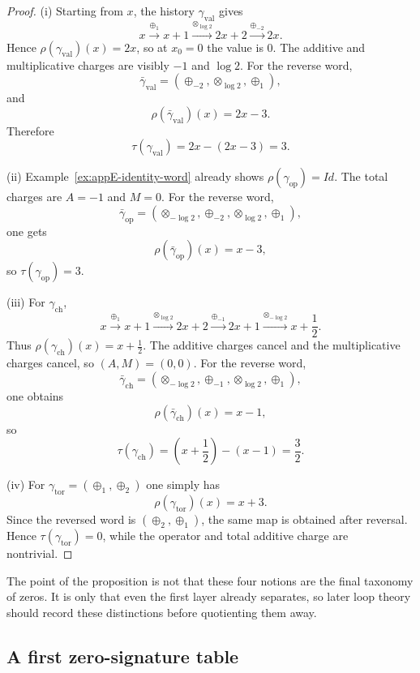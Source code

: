 \begin{proof}
(i) Starting from $x$, the history $\gamma_{\mathrm{val}}$ gives
\[
x\xrightarrow{\oplus_1}x+1
\xrightarrow{\otimes_{\log 2}}2x+2
\xrightarrow{\oplus_{-2}}2x.
\]
Hence $\rho(\gamma_{\mathrm{val}})(x)=2x$, so at $x_0=0$ the value is $0$.
The additive and multiplicative charges are visibly $-1$ and $\log 2$.
For the reverse word,
\[
\bar\gamma_{\mathrm{val}}=(\oplus_{-2},\otimes_{\log 2},\oplus_1),
\]
and
\[
\rho(\bar\gamma_{\mathrm{val}})(x)=2x-3.
\]
Therefore
\[
\tau(\gamma_{\mathrm{val}})=2x-(2x-3)=3.
\]

(ii) Example~\ref{ex:appE-identity-word} already shows $\rho(\gamma_{\mathrm{op}})=Id$.
The total charges are $A=-1$ and $M=0$.
For the reverse word,
\[
\bar\gamma_{\mathrm{op}}=(\otimes_{-\log 2},\oplus_{-2},\otimes_{\log 2},\oplus_1),
\]
one gets
\[
\rho(\bar\gamma_{\mathrm{op}})(x)=x-3,
\]
so $\tau(\gamma_{\mathrm{op}})=3$.

(iii) For $\gamma_{\mathrm{ch}}$,
\[
x\xrightarrow{\oplus_1}x+1
\xrightarrow{\otimes_{\log 2}}2x+2
\xrightarrow{\oplus_{-1}}2x+1
\xrightarrow{\otimes_{-\log 2}}x+\frac12.
\]
Thus $\rho(\gamma_{\mathrm{ch}})(x)=x+\frac12$.
The additive charges cancel and the multiplicative charges cancel, so $(A,M)=(0,0)$.
For the reverse word,
\[
\bar\gamma_{\mathrm{ch}}=(\otimes_{-\log 2},\oplus_{-1},\otimes_{\log 2},\oplus_1),
\]
one obtains
\[
\rho(\bar\gamma_{\mathrm{ch}})(x)=x-1,
\]
so
\[
\tau(\gamma_{\mathrm{ch}})=\left(x+\frac12\right)-(x-1)=\frac32.
\]

(iv) For $\gamma_{\mathrm{tor}}=(\oplus_1,\oplus_2)$ one simply has
\[
\rho(\gamma_{\mathrm{tor}})(x)=x+3.
\]
Since the reversed word is $(\oplus_2,\oplus_1)$, the same map is obtained after reversal. Hence $\tau(\gamma_{\mathrm{tor}})=0$, while the operator and total additive charge are nontrivial.
\end{proof}

The point of the proposition is not that these four notions are the final taxonomy of zeros. It is only that even the first layer already separates, so later loop theory should record these distinctions before quotienting them away.

\subsection{A first zero-signature table}
\label{appE:zero-signature-table}

